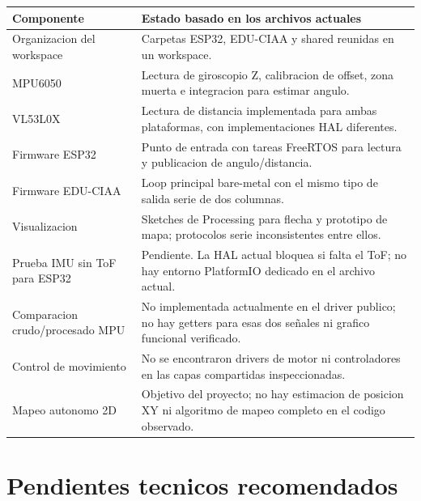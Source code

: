 \documentclass[11pt,a4paper]{article}
\begin{document}
\begin{longtable}{>{\raggedright\arraybackslash}p{} >{\raggedright\arraybackslash}p{}}
\textbf{Componente} & \textbf{Estado basado en los archivos actuales}\\
\hline
Organizacion del workspace & Carpetas ESP32, EDU-CIAA y shared reunidas en un workspace.\\
MPU6050 & Lectura de giroscopio Z, calibracion de offset, zona muerta e integracion para estimar angulo.\\
VL53L0X & Lectura de distancia implementada para ambas plataformas, con implementaciones HAL diferentes.\\
Firmware ESP32 & Punto de entrada con tareas FreeRTOS para lectura y publicacion de angulo/distancia.\\
Firmware EDU-CIAA & Loop principal bare-metal con el mismo tipo de salida serie de dos columnas.\\
Visualizacion & Sketches de Processing para flecha y prototipo de mapa; protocolos serie inconsistentes entre ellos.\\
Prueba IMU sin ToF para ESP32 & Pendiente. La HAL actual bloquea si falta el ToF; no hay entorno PlatformIO dedicado en el archivo actual.\\
Comparacion crudo/procesado MPU & No implementada actualmente en el driver publico; no hay getters para esas dos señales ni grafico funcional verificado.\\
Control de movimiento & No se encontraron drivers de motor ni controladores en las capas compartidas inspeccionadas.\\
Mapeo autonomo 2D & Objetivo del proyecto; no hay estimacion de posicion XY ni algoritmo de mapeo completo en el codigo observado.\\
\end{longtable}

\section{Pendientes tecnicos recomendados}
\end{document}
